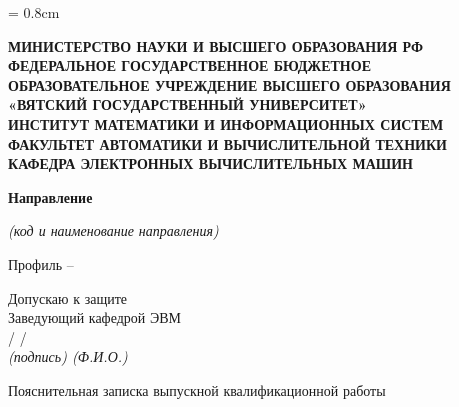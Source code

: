 \begin{titlepage}
	\newpage
	\singlespacing
	\topskip = 0.8cm
	\large

	\begin{center}
		\large
		\bfseries
		МИНИСТЕРСТВО НАУКИ И ВЫСШЕГО ОБРАЗОВАНИЯ РФ \\
		ФЕДЕРАЛЬНОЕ ГОСУДАРСТВЕННОЕ БЮДЖЕТНОЕ \\
		ОБРАЗОВАТЕЛЬНОЕ УЧРЕЖДЕНИЕ ВЫСШЕГО ОБРАЗОВАНИЯ \\
		«ВЯТСКИЙ ГОСУДАРСТВЕННЫЙ УНИВЕРСИТЕТ» \\
		ИНСТИТУТ МАТЕМАТИКИ И ИНФОРМАЦИОННЫХ СИСТЕМ \\
		ФАКУЛЬТЕТ АВТОМАТИКИ И ВЫЧИСЛИТЕЛЬНОЙ ТЕХНИКИ \\
		КАФЕДРА ЭЛЕКТРОННЫХ ВЫЧИСЛИТЕЛЬНЫХ МАШИН
	\end{center}

	\vspace{0.8cm}
	\begin{center}
		\textbf{Направление}
		\uline{\specialization}

		\small
		\textit{(код и наименование направления)}

		\large
		Профиль – \uline{\profile}
	\end{center}

	\vspace{0.8cm}
	\begin{flushright}
		{
			\onehalfspacing
			Допускаю к защите \\
			Заведующий кафедрой ЭВМ \\
		}
		\vspace{1mm}
		\uline{\hspace{3cm}} / \uline{\headofdepartment} / \\
		\vspace{1mm}
		\small
		\itshape
		(подпись) \hspace{1.8cm} (Ф.И.О.) \hspace{1.4cm}

	\end{flushright}

	\vspace{1.5cm}
	\begin{center}
		\huge
		\bfseries
		\topic
	\end{center}
	\vspace{0pt}
	\begin{center}
		Пояснительная записка выпускной квалификационной работы \\
		\tpga
	\end{center}


\end{titlepage}
